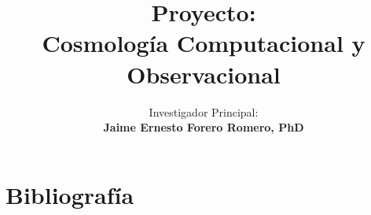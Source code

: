 \documentclass[spanish,notitlepage,letterpaper,11pt]{article} %
\title{Proyecto:\\{\bf Cosmolog\'ia Computacional y Observacional}}
\author{Investigador Principal:\\{\bf Jaime Ernesto Forero Romero,
    PhD}\\
}
\begin{document}





\newpage 
\tableofcontents 




















\section{Bibliograf\'ia}

{}

\end{document}
